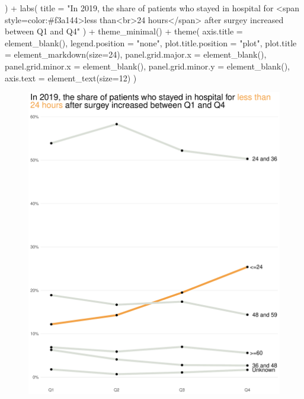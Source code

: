 \documentclass[
  letterpaper,
  DIV=11,
  numbers=noendperiod]{scrartcl}
\newenvironment{Shaded}{\begin{snugshade}}{\end{snugshade}}
\newcommand{\AttributeTok}[1]{\textcolor[rgb]{0.40,0.45,0.13}{#1}}
\newcommand{\DecValTok}[1]{\textcolor[rgb]{0.68,0.00,0.00}{#1}}
\newcommand{\FunctionTok}[1]{\textcolor[rgb]{0.28,0.35,0.67}{#1}}
\newcommand{\NormalTok}[1]{\textcolor[rgb]{0.00,0.23,0.31}{#1}}
\newcommand{\SpecialCharTok}[1]{\textcolor[rgb]{0.37,0.37,0.37}{#1}}
\newcommand{\StringTok}[1]{\textcolor[rgb]{0.13,0.47,0.30}{#1}}
\begin{document}
\begin{Shaded}
\begin{Highlighting}[]
\NormalTok{  ) }\SpecialCharTok{+}
  \FunctionTok{labs}\NormalTok{(}
    \AttributeTok{title =} \StringTok{"In 2019, the share of patients who stayed in hospital for \textless{}span style=\textquotesingle{}color:\#f3a144\textquotesingle{}\textgreater{}less than\textless{}br\textgreater{}24 hours\textless{}/span\textgreater{} after surgey increased between Q1 and Q4"}
\NormalTok{  ) }\SpecialCharTok{+}
  \FunctionTok{theme\_minimal}\NormalTok{() }\SpecialCharTok{+}
  \FunctionTok{theme}\NormalTok{(}
    \AttributeTok{axis.title =} \FunctionTok{element\_blank}\NormalTok{(),}
    \AttributeTok{legend.position =} \StringTok{"none"}\NormalTok{,}
    \AttributeTok{plot.title.position =} \StringTok{"plot"}\NormalTok{,}
    \AttributeTok{plot.title =} \FunctionTok{element\_markdown}\NormalTok{(}\AttributeTok{size=}\DecValTok{24}\NormalTok{),}
    \AttributeTok{panel.grid.major.x =} \FunctionTok{element\_blank}\NormalTok{(),}
    \AttributeTok{panel.grid.minor.x =} \FunctionTok{element\_blank}\NormalTok{(),}
    \AttributeTok{panel.grid.minor.y =} \FunctionTok{element\_blank}\NormalTok{(),}
    \AttributeTok{axis.text =} \FunctionTok{element\_text}\NormalTok{(}\AttributeTok{size=}\DecValTok{12}\NormalTok{)}
\NormalTok{  )}
\end{Highlighting}
\end{Shaded}

\begin{figure}[H]

{\centering \includegraphics{graph_makeover_files/figure-pdf/unnamed-chunk-5-1.pdf}

}

\end{figure}
\end{document}
